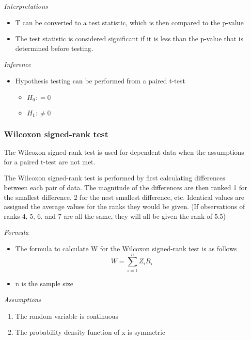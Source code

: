 \documentclass[
]{article}
\providecommand{\tightlist}{%
  \setlength{\itemsep}{0pt}\setlength{\parskip}{0pt}}
\begin{document}
\emph{Interpretations}

\begin{itemize}
\tightlist
\item
  T can be converted to a test statistic, which is then compared to the p-value
\item
  The test statistic is considered significant if it is less than the p-value that is determined before testing.
\end{itemize}

\emph{Inference}

\begin{itemize}
\tightlist
\item
  Hypothesis testing can be performed from a paired t-test

  \begin{itemize}
  \tightlist
  \item
    \(H_{0}: = 0\)
  \item
    \(H_{1}: \ne 0\)
  \end{itemize}
\end{itemize}

\hypertarget{wilcoxon-signed-rank-test}{%
\subsubsection{Wilcoxon signed-rank test}\label{wilcoxon-signed-rank-test}}

The Wilcoxon signed-rank test is used for dependent data when the assumptions for a paired t-test are not met.

The Wilcoxon signed-rank test is performed by first calculating differences between each pair of data. The magnitude of the differences are then ranked 1 for the smallest difference, 2 for the nest smallest difference, etc. Identical values are assigned the average values for the ranks they would be given. (If observations of ranks 4, 5, 6, and 7 are all the same, they will all be given the rank of 5.5)

\emph{Formula}

\begin{itemize}
\tightlist
\item
  The formula to calculate W for the Wilcoxon signed-rank test is as follows
  \[W = \sum_{i=1}^{n}Z_{i}R_{i}\]
\item
  n is the sample size
\end{itemize}

\emph{Assumptions}

\begin{enumerate}
\def\labelenumi{\arabic{enumi}.}
\tightlist
\item
  The random variable is continuous
\item
  The probability density function of x is symmetric
\end{enumerate}
\end{document}
